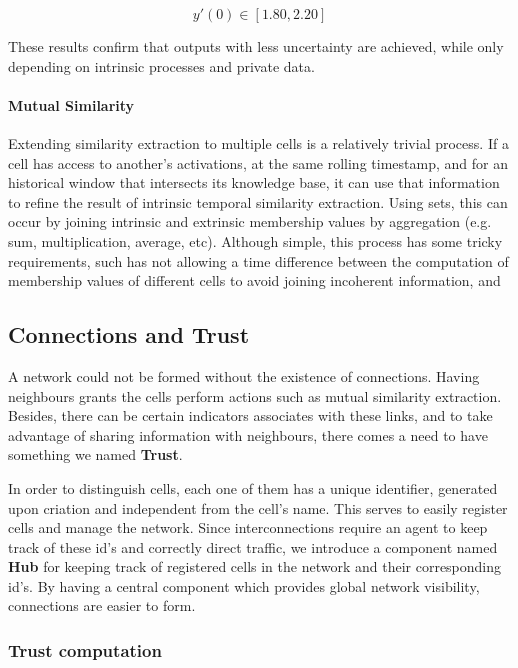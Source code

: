 \begin{equation}
    y'(0) \in [1.80, 2.20]
\end{equation}

These results confirm that outputs with less uncertainty are achieved, while only depending on intrinsic processes and private data.

\paragraph{Mutual Similarity}
Extending similarity extraction to multiple cells is a relatively trivial process. If a cell has access to another's activations, at the same rolling timestamp, and for an historical window that intersects its knowledge base, it can use that information to refine the result of intrinsic temporal similarity extraction. Using sets, this can occur by joining intrinsic and extrinsic membership values by aggregation (e.g. sum, multiplication, average, etc).
Although simple, this process has some tricky requirements, such has not allowing a time difference between the computation of membership values of different cells to avoid joining incoherent information, and 

\subsection{Connections and Trust}

A network could not be formed without the existence of connections. Having neighbours grants the cells perform actions such as mutual similarity extraction. Besides, there can be certain indicators associates with these links, and to take advantage of sharing information with neighbours, there comes a need to have something we named \textbf{Trust}.

In order to distinguish cells, each one of them has a unique identifier, generated upon criation and independent from the cell's name. This serves to easily register cells and manage the network. Since interconnections require an agent to keep track of these id's and correctly direct traffic, we introduce a component named \textbf{Hub} for keeping track of registered cells in the network and their corresponding id's. By having a central component which provides global network visibility, connections are easier to form.


\subsubsection{Trust computation}


